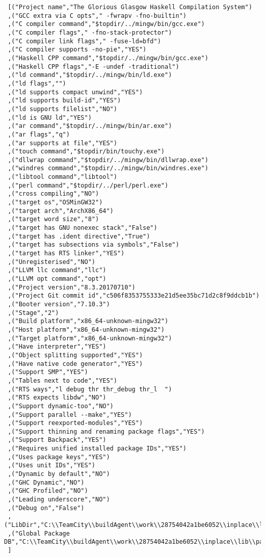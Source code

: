\begin{verbatim}
 [("Project name","The Glorious Glasgow Haskell Compilation System")
 ,("GCC extra via C opts"," -fwrapv -fno-builtin")
 ,("C compiler command","$topdir/../mingw/bin/gcc.exe")
 ,("C compiler flags"," -fno-stack-protector")
 ,("C compiler link flags"," -fuse-ld=bfd")
 ,("C compiler supports -no-pie","YES")
 ,("Haskell CPP command","$topdir/../mingw/bin/gcc.exe")
 ,("Haskell CPP flags","-E -undef -traditional")
 ,("ld command","$topdir/../mingw/bin/ld.exe")
 ,("ld flags","")
 ,("ld supports compact unwind","YES")
 ,("ld supports build-id","YES")
 ,("ld supports filelist","NO")
 ,("ld is GNU ld","YES")
 ,("ar command","$topdir/../mingw/bin/ar.exe")
 ,("ar flags","q")
 ,("ar supports at file","YES")
 ,("touch command","$topdir/bin/touchy.exe")
 ,("dllwrap command","$topdir/../mingw/bin/dllwrap.exe")
 ,("windres command","$topdir/../mingw/bin/windres.exe")
 ,("libtool command","libtool")
 ,("perl command","$topdir/../perl/perl.exe")
 ,("cross compiling","NO")
 ,("target os","OSMinGW32")
 ,("target arch","ArchX86_64")
 ,("target word size","8")
 ,("target has GNU nonexec stack","False")
 ,("target has .ident directive","True")
 ,("target has subsections via symbols","False")
 ,("target has RTS linker","YES")
 ,("Unregisterised","NO")
 ,("LLVM llc command","llc")
 ,("LLVM opt command","opt")
 ,("Project version","8.3.20170710")
 ,("Project Git commit id","c506f8353755333e21d5ee35bc71d2c8f9ddcb1b")
 ,("Booter version","7.10.3")
 ,("Stage","2")
 ,("Build platform","x86_64-unknown-mingw32")
 ,("Host platform","x86_64-unknown-mingw32")
 ,("Target platform","x86_64-unknown-mingw32")
 ,("Have interpreter","YES")
 ,("Object splitting supported","YES")
 ,("Have native code generator","YES")
 ,("Support SMP","YES")
 ,("Tables next to code","YES")
 ,("RTS ways","l debug thr thr_debug thr_l  ")
 ,("RTS expects libdw","NO")
 ,("Support dynamic-too","NO")
 ,("Support parallel --make","YES")
 ,("Support reexported-modules","YES")
 ,("Support thinning and renaming package flags","YES")
 ,("Support Backpack","YES")
 ,("Requires unified installed package IDs","YES")
 ,("Uses package keys","YES")
 ,("Uses unit IDs","YES")
 ,("Dynamic by default","NO")
 ,("GHC Dynamic","NO")
 ,("GHC Profiled","NO")
 ,("Leading underscore","NO")
 ,("Debug on","False")
 ,("LibDir","C:\\TeamCity\\buildAgent\\work\\28754042a1be6052\\inplace\\lib")
 ,("Global Package DB","C:\\TeamCity\\buildAgent\\work\\28754042a1be6052\\inplace\\lib\\package.conf.d")
 ]
\end{verbatim}
